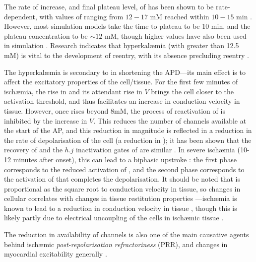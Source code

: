 \documentclass[../thesis-main.tex]{subfiles}
\begin{document}
The rate of increase, and final plateau level, of \ko{} has been shown to be rate-dependent, with values of \ko{} ranging from $12-17$ mM reached within $10-15$ min \citep{Rodriguez2002, Coetzee1987}. However, most simulation models take the time to plateau to be 10 min, and the plateau concentration to be $\sim12$ mM, though higher values have also been used in simulation \citep{Ferrero2003a, Trenor2007}. Research indicates that hyperkal\ae{}mia (with \ko{} greater than 12.5 mM) is vital to the development of reentry, with its absence precluding reentry \citep{Ferrero2003}.

The hyperkal\ae{}mia is secondary to \ikatp{} in shortening the APD---its main effect is to affect the excitatory properties of the cell/tissue. For the first few minutes of isch\ae{}mia, the rise in \ko{} and its attendant rise in $V$ brings the cell closer to the activation threshold, and thus facilitates an increase in conduction velocity in tissue. However, once \ko{} rises beyond 8mM, the process of reactivation of \ina{} is inhibited by the increase in $V$. This reduces the number of \ina{} channels available at the start of the AP, and this reduction in \ina{} magnitude is reflected in a reduction in the rate of depolarisation of the cell (a reduction in \dvdtmax{}); it has been shown that the recovery of \dvdtmax{} and the $h.j$ inactivation gates of \ina{} are similar \citep{Shaw1997}. In severe isch\ae{}mia (10-12 minutes after onset), this can lead to a biphasic upstroke \citep{Barrett1997}: the first phase corresponds to the reduced activation of \ina{}, and the second phase corresponds to the activation of \ica{} that completes the depolarisation. It should be noted that \dvdtmax{} is proportional as the square root to conduction velocity in tissue, so changes in cellular \dvdtmax{} correlates with changes in tissue restitution properties \citep{Kleber2004, Walton1983, Tasaki1957}---isch\ae{}mia is known to lead to a reduction in conduction velocity in tissue \citep{Caldwell2007}, though this is likely partly due to electrical uncoupling of the cells in isch\ae{}mic tissue \citep{Kleber1987}.

The reduction in availability of \ina{} channels is also one of the main causative agents behind isch\ae{}mic \emph{post-repolarisation refractoriness} (PRR), and changes in myocardial excitability generally \citep{Coronel2012}.
\end{document}
